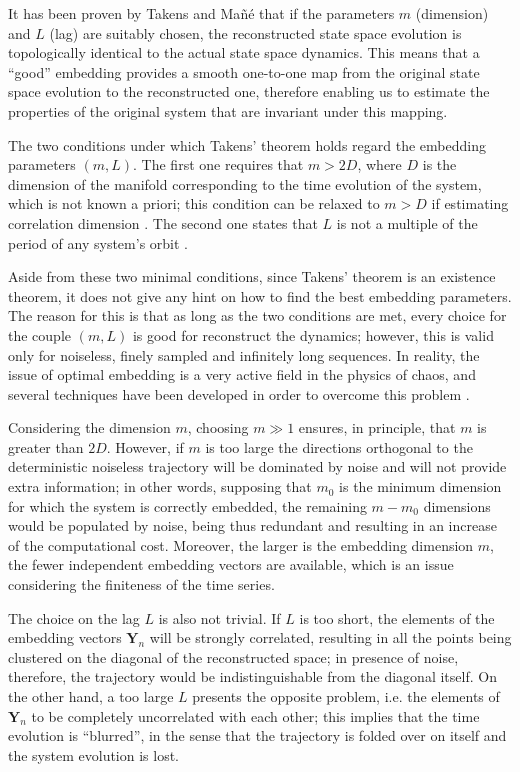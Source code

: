 It has been proven by Takens \cite{ref:takens2006detecting} and Ma{\~n}{\'e} \cite{ref:mane2006dimension} that
if the parameters $m$ (dimension) and $L$ (lag) are suitably chosen,
the reconstructed state space evolution is topologically identical to the actual state space dynamics.
This means that a ``good” embedding provides a smooth one-to-one map from the
original state space evolution to the reconstructed one, therefore enabling us to estimate the
properties of the original system that are invariant under this mapping.

The two conditions under which Takens' theorem holds regard the embedding parameters $(m,L)$.
The first one requires that $m>2D$, where $D$ is the dimension of the manifold corresponding to the
time evolution of the system, which is not known a priori; this condition can be relaxed to $m>D$ if
estimating correlation dimension \cite{ref:ding1993estimating}.
The second one states that $L$ is not a multiple of the period of any system's orbit \cite{ref:grassberger1991nonlinear}.

Aside from these two minimal conditions, since Takens' theorem is an existence theorem, it does not
give any hint on how to find the best embedding parameters. The reason for this is that as long as the
two conditions are met, every choice for the couple $(m,L)$ is good for reconstruct the dynamics;
however, this is valid only for noiseless, finely sampled and infinitely long sequences. In reality,
the issue of optimal embedding is a very active field in the physics of chaos, and several techniques
have been developed in order to overcome this problem \cite{ref:perinelli2018identification,ref:perinelli2020chasing,ref:casdagli1991state}.

Considering the dimension $m$, choosing $m\gg1$ ensures, in principle, that $m$ is
greater than $2D$. However, if $m$ is too large the directions orthogonal to the deterministic noiseless
trajectory will be dominated by noise and will not provide extra information; in other words, supposing
that $m_0$ is the minimum dimension for which the system is correctly embedded, the remaining $m-m_0$
dimensions would be populated by noise, being thus redundant and resulting in an increase of the
computational cost. Moreover, the larger is the embedding dimension $m$,
the fewer independent embedding vectors are available, which is an issue considering the finiteness
of the time series.

The choice on the lag $L$ is also not trivial. If $L$ is too short, the elements of the embedding vectors
$\mathbf{Y}_n$ will be strongly correlated, resulting in all the points being clustered on the
diagonal of the reconstructed space; in presence of noise, therefore, the trajectory would be
indistinguishable from the diagonal itself. On the other hand, a too large $L$ presents the opposite
problem, i.e. the elements of $\mathbf{Y}_n$ to be completely uncorrelated with each other;
this implies that the time evolution is ``blurred'', in the sense that the trajectory is folded over on itself
and the system evolution is lost.


